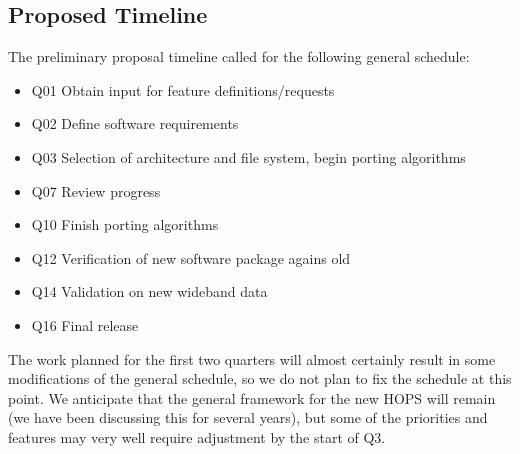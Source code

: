 \subsection{Proposed Timeline}
\label{sec:timeline}

The preliminary proposal timeline called for the following general
schedule:
\begin{itemize}[itemsep=-1ex,label={}]
 \item Q01 Obtain input for feature definitions/requests
 \item Q02 Define software requirements
 \item Q03 Selection of architecture and file system, begin porting algorithms
 \item Q07 Review progress
 \item Q10 Finish porting algorithms
 \item Q12 Verification of new software package agains old
 \item Q14 Validation on new wideband data
 \item Q16 Final release
\end{itemize}
The work planned for the first two quarters will almost certainly result
in some modifications of the general schedule, so we do not plan to fix
the schedule at this point.  We anticipate that the general framework for
the new HOPS will remain (we have been discussing this for several years),
but some of the priorities and features may very well require adjustment
by the start of Q3.

%
%
